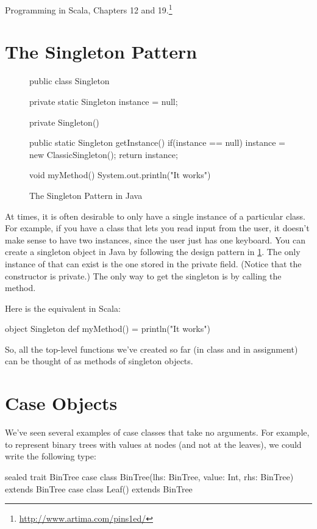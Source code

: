 \documentclass[9pt]{extbook}
\begin{document}
Programming in Scala, Chapters 12 and 19.\footnote{\url{http://www.artima.com/pins1ed/}}

\section{The Singleton Pattern}

\begin{figure}
\begin{javacode}
public class Singleton {
  private static Singleton instance = null;

  private Singleton() { }

  public static Singleton getInstance() {
    if(instance == null) {
      instance = new ClassicSingleton();
    }
    return instance;
  }

  void myMethod() {
    System.out.println("It works")
  }

}
\end{javacode}
\caption{The Singleton Pattern in Java}
\label{javasingleton}
\end{figure}

At times, it is often desirable to only have a single instance of a particular
class. For example, if you have a class that lets you read input from the
user, it doesn't make sense to have two instances, since the user just has
one keyboard. You can create a singleton object in Java by following the
design pattern in \cref{javasingleton}. The only instance of 
that can exist is the one stored in the private field. (Notice that the constructor
is private.) The only way to get
the singleton is by calling the  method.

Here is the equivalent in Scala:

\begin{scalacode}
object Singleton {
  def myMethod() = println("It works")
}
\end{scalacode}

So, all the top-level functions we've created so far (in class and in
assignment) can be thought of as methods of singleton objects.

\section{Case Objects}

We've seen several examples of case classes that take no arguments. For example,
to represent binary trees with values at nodes (and not at the leaves), we could
write the following type:
%
\begin{scalacode}
sealed trait BinTree
case class BinTree(lhs: BinTree, value: Int, rhs: BinTree) extends BinTree
case class Leaf() extends BinTree
\end{scalacode}
\end{document}
